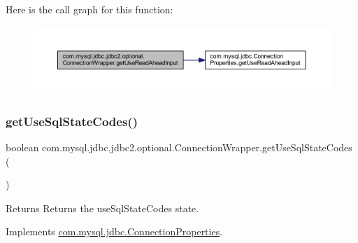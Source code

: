 Here is the call graph for this function\+:
\nopagebreak
\begin{figure}[H]
\begin{center}
\leavevmode
\includegraphics[width=350pt]{classcom_1_1mysql_1_1jdbc_1_1jdbc2_1_1optional_1_1_connection_wrapper_a4fa0114adf1b3a739082aafb7e016d47_cgraph}
\end{center}
\end{figure}
\mbox{\label{classcom_1_1mysql_1_1jdbc_1_1jdbc2_1_1optional_1_1_connection_wrapper_a2edc5b51339d1e377af614a97cc844ad}} 
\subsubsection{\texorpdfstring{get\+Use\+Sql\+State\+Codes()}{getUseSqlStateCodes()}}
{\footnotesize\ttfamily boolean com.\+mysql.\+jdbc.\+jdbc2.\+optional.\+Connection\+Wrapper.\+get\+Use\+Sql\+State\+Codes (\begin{DoxyParamCaption}{ }\end{DoxyParamCaption})}

\begin{DoxyReturn}{Returns}
Returns the use\+Sql\+State\+Codes state. 
\end{DoxyReturn}


Implements \mbox{\hyperlink{interfacecom_1_1mysql_1_1jdbc_1_1_connection_properties_a399c463bcd4def7a8476647b2e09fd72}{com.\+mysql.\+jdbc.\+Connection\+Properties}}.

